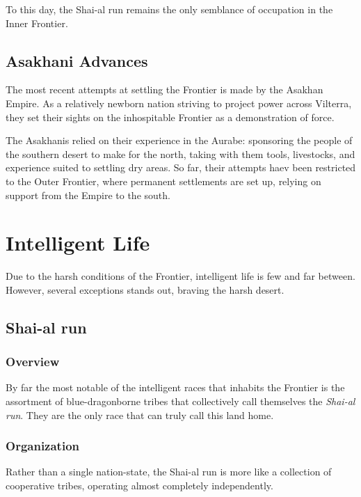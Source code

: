 \documentclass[../main.tex]{subfiles}
\begin{document}
To this day, the Shai-al run remains the only semblance of
occupation in the Inner Frontier.

\subsection{Asakhani Advances}
The most recent attempts at settling the Frontier is made by
the Asakhan Empire. As a relatively newborn nation striving to
project power across Vilterra, they set their sights on the
inhospitable Frontier as a demonstration of force.

The Asakhanis relied on their experience in the Aurabe:
sponsoring the people of the southern desert to make for the north,
taking with them tools, livestocks, and experience suited to settling dry areas.
So far, their attempts haev been restricted to the Outer Frontier,
where permanent settlements are set up, relying on support from
the Empire to the south.

\section{Intelligent Life}
Due to the harsh conditions of the Frontier, intelligent life is few and
far between. However, several exceptions stands out, braving the
harsh desert.

\subsection{Shai-al run}
\subsubsection{Overview}
By far the most notable of the intelligent races that inhabits the
Frontier is the assortment of blue-dragonborne tribes that collectively
call themselves the \emph{Shai-al run}. They are the only race that can
truly call this land home.

\subsubsection{Organization}
Rather than a single nation-state, the Shai-al run is more like a
collection of cooperative tribes, operating almost completely
independently.
\end{document}
